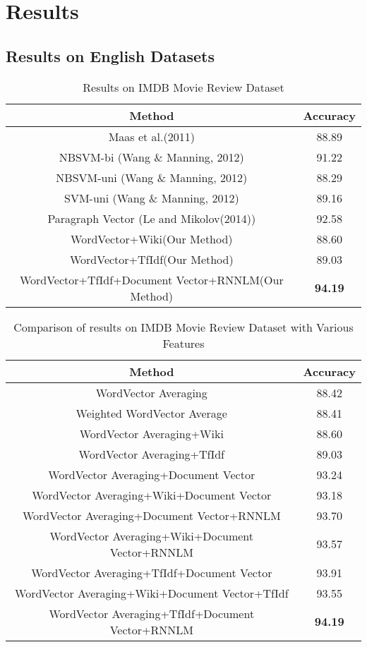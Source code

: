 \chapter{Results}
\label{sec:result}
\section{Results on English Datasets}

\begin {table}[h!]
\centering
\begin{tabular}{ | c | c | }
\hline
\textbf{Method} & \textbf{Accuracy} \\ \hline
Maas et al.(2011) & 88.89\\ \hline
NBSVM-bi (Wang \& Manning, 2012) & 91.22\\ \hline
NBSVM-uni (Wang \& Manning, 2012) & 88.29\\ \hline
SVM-uni (Wang \& Manning, 2012) & 89.16\\ \hline
Paragraph Vector (Le and Mikolov(2014)) & 92.58\\ \hline
WordVector+Wiki(Our Method) & 88.60\\ \hline
WordVector+TfIdf(Our Method) & 89.03\\ \hline
WordVector+TfIdf+Document Vector+RNNLM(Our Method) & \textbf{94.19}\\ \hline
\end{tabular}
\caption {Results on IMDB Movie Review Dataset}
\end{table}

\begin {table}[h!]
\centering
\begin{tabular}{ | c | c | }
\hline
\textbf{Method} & \textbf{Accuracy} \\ \hline
WordVector Averaging & 88.42\\ \hline
Weighted WordVector Average & 88.41\\ \hline
WordVector Averaging+Wiki & 88.60\\ \hline
WordVector Averaging+TfIdf & 89.03\\ \hline
WordVector Averaging+Document Vector & 93.24\\ \hline
WordVector Averaging+Wiki+Document Vector & 93.18\\ \hline
WordVector Averaging+Document Vector+RNNLM & 93.70\\ \hline
WordVector Averaging+Wiki+Document Vector+RNNLM & 93.57\\ \hline
WordVector Averaging+TfIdf+Document Vector & 93.91\\ \hline
WordVector Averaging+Wiki+Document Vector+TfIdf & 93.55\\ \hline
WordVector Averaging+TfIdf+Document Vector+RNNLM & \textbf{94.19}\\ \hline
\end{tabular}
\caption {Comparison of results on IMDB Movie Review Dataset with Various Features}
\end{table}

